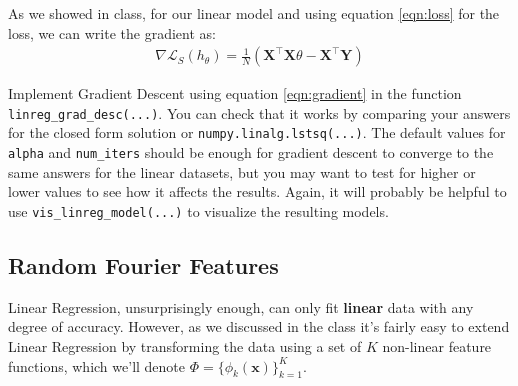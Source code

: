 \documentclass{article} %
\begin{document}
\begin{algorithm}[H]
	\SetAlgoLined
\end{algorithm}

As we showed in class, for our linear model and using equation \ref{eqn:loss} for the loss, we can write the gradient as:
\begin{align}
	\nabla\mathcal{L}_S(h_\theta) = \frac{1}{N}\left(\mathbf{X}^\top\mathbf{X}\theta -\mathbf{X}^\top\mathbf{Y}\right) \label{eqn:gradient}
\end{align}

Implement Gradient Descent using equation \ref{eqn:gradient} in the function \texttt{linreg\_grad\_desc(...)}. You can check 
that it works by comparing your answers for the closed form solution or \texttt{numpy.linalg.lstsq(...)}. The default values 
for \texttt{alpha} and \texttt{num\_iters} should be enough for gradient descent to converge to the same answers for the 
linear datasets, but you may want to test for higher or lower values to see how it affects the results. Again, it will 
probably be helpful to use \texttt{vis\_linreg\_model(...)} to visualize the resulting models.

\subsection*{Random Fourier Features}

Linear Regression, unsurprisingly enough, can only fit \textbf{linear} data with any degree of accuracy. However, as we 
discussed in the class it's fairly easy to extend Linear Regression by transforming the data using a set of \(K\) non-linear 
feature functions, which we'll denote \(\Phi=\{\phi_k(\mathbf{x})\}_{k=1}^K\).
\end{document}
